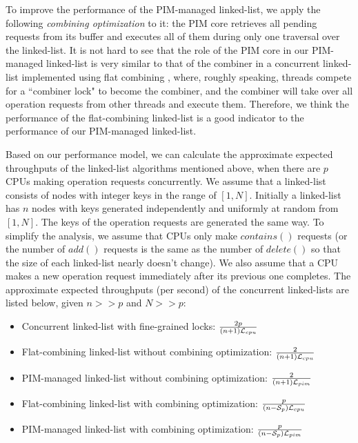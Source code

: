To improve the performance of the PIM-managed linked-list,
we apply the following \emph{combining optimization} to it:
the PIM core retrieves all pending requests from its buffer and
executes all of them during only one traversal over the linked-list.
It is not hard to see that the role of the PIM core in our PIM-managed linked-list
is very similar to that of the combiner in a concurrent linked-list implemented
using flat combining \cite{Hendler10}, where, roughly speaking,
threads compete for a ``combiner lock" to become the combiner, and
the combiner will take over all operation requests from other threads and execute them.
Therefore, we think the performance of the flat-combining linked-list is a good indicator to
the performance of our PIM-managed linked-list.

Based on our performance model, we can calculate the approximate expected
throughputs of the linked-list algorithms mentioned above, 
when there are $p$ CPUs making operation requests concurrently.
We assume that a linked-list consists of nodes with integer keys in the range of $[1, N]$.
Initially a linked-list has $n$ nodes with keys generated independently
and uniformly at random from $[1, N]$.
The keys of the operation requests are generated the same way.
To simplify the analysis, we assume that CPUs only make $contains()$ requests
(or the number of $add()$ requests is the same as the number of $delete()$
so that the size of each linked-list nearly doesn't change).
We also assume that a CPU makes a new operation request immediately after
its previous one completes.
The approximate expected throughputs (per second) of the concurrent linked-lists
are listed below, given $n >> p$ and $N >> p$: 
\begin{itemize}
\item Concurrent linked-list with fine-grained locks:
	${2p \over (n+1)\mathcal{L}_{cpu}}$

\item Flat-combining linked-list without combining optimization:
	${2 \over (n+1)\mathcal{L}_{cpu}}$

\item PIM-managed linked-list without combining optimization:
	${2 \over (n+1)\mathcal{L}_{pim}}$

\item Flat-combining linked-list with combining optimization:
    ${p \over (n-\mathcal{S}_{p})\mathcal{L}_{cpu}}$

\item PIM-managed linked-list with combining optimization:
    ${p \over (n-\mathcal{S}_{p})\mathcal{L}_{pim}}$
\end{itemize}
